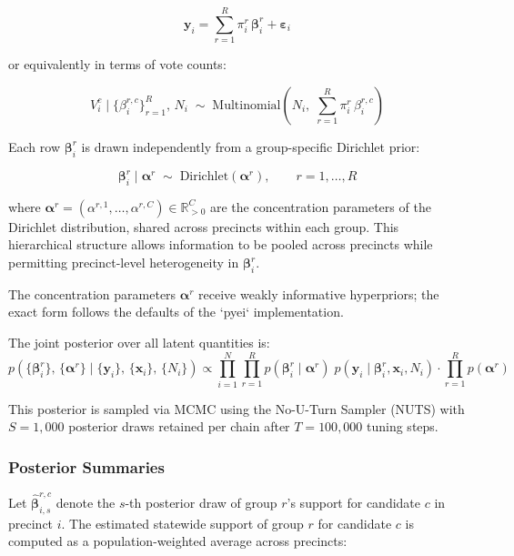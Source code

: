 \documentclass[sn-vancouver,Numbered]{sn-jnl}
\theoremstyle{thmstyleone}%
\theoremstyle{thmstyletwo}%
\theoremstyle{thmstylethree}%
\begin{document}
\begin{equation}
\mathbf{y}_i = \sum_{r=1}^{R} \pi^r_i \, \boldsymbol{\beta}^r_i + \boldsymbol{\varepsilon}_i
\label{eq:aggregation_constraint}
\end{equation}

or equivalently in terms of vote counts:

\begin{equation}
V^c_i \;\Big|\; \{\beta^{r,c}_i\}_{r=1}^{R},\, N_i \;\sim\; \text{Multinomial}\!\left(N_i,\; \sum_{r=1}^{R} \pi^r_i \,\beta^{r,c}_i\right)
\label{eq:vote_counts_constraint}
\end{equation}

Each row $\boldsymbol{\beta}^r_i$ is drawn independently from a group-specific Dirichlet prior:

\begin{equation}
\boldsymbol{\beta}^r_i \;\Big|\; \boldsymbol{\alpha}^r \;\sim\; \text{Dirichlet}\!\left(\boldsymbol{\alpha}^r\right), \qquad r = 1, \ldots, R
\label{eq:hierarchical_prior}
\end{equation}

where $\boldsymbol{\alpha}^r = (\alpha^{r,1}, \ldots, \alpha^{r,C}) \in \mathbb{R}^C_{>0}$ are the concentration parameters of the Dirichlet distribution, shared across precincts within each group. This hierarchical structure allows information to be pooled across precincts while permitting precinct-level heterogeneity in $\boldsymbol{\beta}^r_i$.

The concentration parameters $\boldsymbol{\alpha}^r$ receive weakly informative hyperpriors; the exact form follows the defaults of the `pyei` implementation.

The joint posterior over all latent quantities is:
\begin{equation}
p\!\left(\{\boldsymbol{\beta}^r_i\},\, \{\boldsymbol{\alpha}^r\} \;\Big|\; \{\mathbf{y}_i\},\, \{\mathbf{x}_i\},\, \{N_i\}\right) \propto \prod_{i=1}^{N} \prod_{r=1}^{R} p(\boldsymbol{\beta}^r_i \mid \boldsymbol{\alpha}^r)\; p(\mathbf{y}_i \mid \boldsymbol{\beta}^r_i, \mathbf{x}_i, N_i) \cdot \prod_{r=1}^{R} p(\boldsymbol{\alpha}^r)
\label{eq:posterior_inference}
\end{equation}


This posterior is sampled via MCMC using the No-U-Turn Sampler (NUTS) with $S = 1{,}000$ posterior draws retained per chain after $T = 100{,}000$ tuning steps.

\subsubsection{Posterior Summaries}
Let $\hat{\boldsymbol{\beta}}^{r,c}_{i,s}$ denote the $s$-th posterior draw of group $r$'s support for candidate $c$ in precinct $i$. The estimated statewide support of group $r$ for candidate $c$ is computed as a population-weighted average across precincts:
\end{document}
